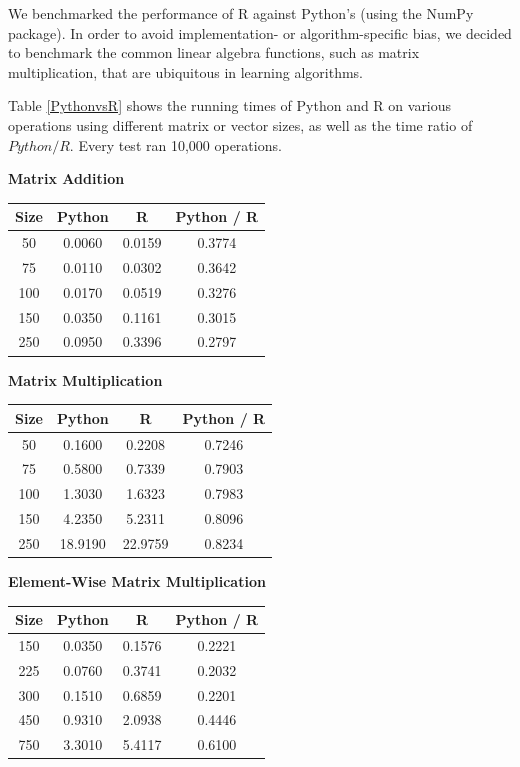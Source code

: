 \documentclass[%
  final,
  notitlepage,
  narroweqnarray,
  inline,
]{ieee}
\begin{document}
We benchmarked the performance of R against Python's (using the NumPy package).
In order to avoid implementation- or algorithm-specific bias, we decided to
benchmark the common linear algebra functions, such as matrix multiplication,
that are ubiquitous in learning algorithms.

Table \ref{PythonvsR} shows the running times of Python and R on various
operations using different matrix or vector sizes, as well as the time ratio of
$Python / R$. Every test ran 10,000 operations.

\begin{table}[h!]
  \scriptsize
  \begin{center}
    \vspace{1em}
    \textbf{Matrix Addition} \\
    \begin{tabular}{cccc}
      Size  & Python  &  R      & Python / R \\
      \hline
      50  & 0.0060 & 0.0159 & 0.3774 \\
      75  & 0.0110 & 0.0302 & 0.3642 \\
      100 & 0.0170 & 0.0519 & 0.3276 \\
      150 & 0.0350 & 0.1161 & 0.3015 \\
      250 & 0.0950 & 0.3396 & 0.2797 \\
    \end{tabular}

    \vspace{1em}
    \textbf{Matrix Multiplication} \\
    \begin{tabular}{cccc}
      Size  & Python  &  R    & Python / R \\
      \hline
      50  & 0.1600  & 0.2208  & 0.7246 \\
      75  & 0.5800  & 0.7339  & 0.7903 \\
      100 & 1.3030  & 1.6323  & 0.7983 \\
      150 & 4.2350  & 5.2311  & 0.8096 \\
      250 & 18.9190 & 22.9759 & 0.8234 \\
    \end{tabular}

    \vspace{1em}
    \textbf{Element-Wise Matrix Multiplication} \\
    \begin{tabular}{cccc}
      Size  & Python  &  R       & Python / R \\
      \hline
      150   & 0.0350  &  0.1576  &  0.2221 \\
      225   & 0.0760  &  0.3741  &  0.2032 \\
      300   & 0.1510  &  0.6859  &  0.2201 \\
      450   & 0.9310  &  2.0938  &  0.4446 \\
      750   & 3.3010  &  5.4117  &  0.6100 \\
    \end{tabular}


\end{center}
\end{table}
\end{document}
